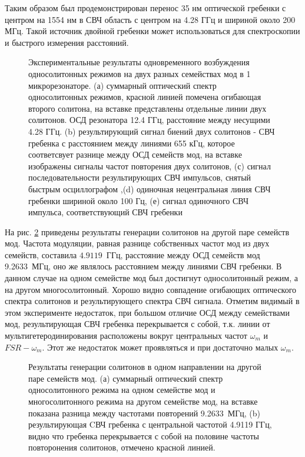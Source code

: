 Таким образом был продемонстрирован перенос 35 нм оптической гребенки с центром на 1554 нм в СВЧ область с центром на 4.28 ГГц и шириной около 200 МГц. Такой источник двойной гребенки может использоваться для спектроскопии и быстрого измерения расстояний.

\begin{figure}[ht]
\begin{minipage}[ht]{1\linewidth}
\end{minipage}
\caption{Экспериментальные результаты одновременного возбуждения односолитонных режимов на двух разных семействах мод в 1 микрорезонаторе. (а) суммарный оптический спектр односолитонных режимов, красной линией помечена огибающая второго солитона, на вставке представлены отдельные линии двух солитонов. ОСД резонатора 12.4 ГГц, расстояние между несущими 4.28 ГГц. (b) результирующий сигнал биений двух солитонов - СВЧ гребенка с расстоянием между линиями 655 кГц, которое соответсвует разнице между ОСД семейств мод, на вставке изображены сигналы частот повторения двух солитонов, (с) сигнал последовательности результирующих СВЧ импульсов, снятый быстрым осциллографом ,(d) одиночная нецентральная линия СВЧ гребенки шириной около 100 Гц, (е) сигнал одиночного СВЧ импульса, соответствующий СВЧ гребенки}
\label{Co_Scheme_results}
\end{figure}

На рис. \ref{coscheme_different_types} приведены результаты генерации солитонов на другой паре семейств мод. Частота модуляции, равная разнице собственных частот мод из двух семейств, составила $4.9119$~ГГц, расстояние между ОСД семейств мод 9.2633~МГц, оно же являлось расстоянием между линиями СВЧ гребенки. В данном случае на одном семействе мод был достигнут односолитонный режим, а на другом многосолитонный. Хорошо видно совпадение огибающих оптического спектра солитонов и результирующего спектра СВЧ сигнала. Отметим видимый в этом эксперименте недостаток, при большом отличие ОСД между семействами мод, результирующая СВЧ гребенка перекрывается с собой, т.к. линии от мультигетеродинирования расположены вокруг центральных частот $\omega_m$ и $FSR-\omega_m$. Этот же недостаток может проявляться и при достаточно малых $\omega_m$.

\begin{figure}[ht]
\begin{minipage}[ht]{1\linewidth}
\end{minipage}
\caption{Результаты генерации солитонов в одном направлении на другой паре семейств мод. (а) суммарный оптический спектр односолитонного режима на одном семействе мод и многосолитонного режима на другом семействе мод, на вставке показана разница между частотами повторений 9.2633~МГц, (b) результирующая CВЧ гребенка с центральной частотой 4.9119 ГГц, видно что гребенка перекрывается с собой на половине частоты повторонения солитонов, отмечено красной линией.}
\label{coscheme_different_types}
\end{figure}

